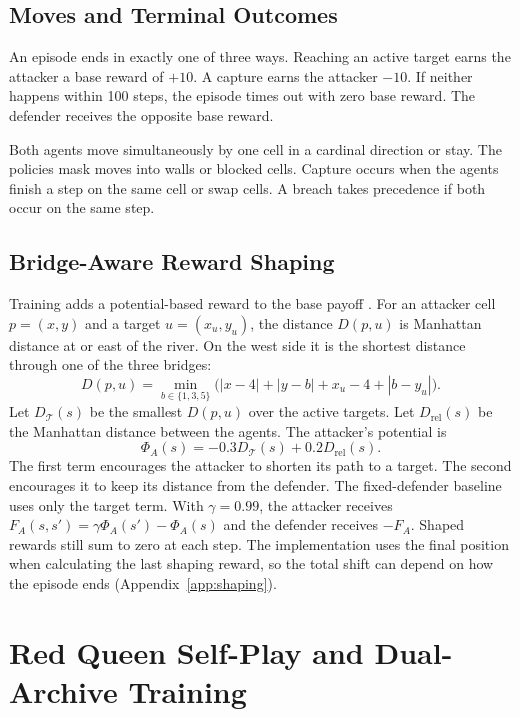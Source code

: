 \documentclass[conference,a4paper]{IEEEtran}
\begin{document}
\subsection{Moves and Terminal Outcomes}
\begin{samepage}
An episode ends in exactly one of three ways. Reaching an active target earns the attacker a base reward of $+10$. A capture earns the attacker $-10$. If neither happens within 100 steps, the episode times out with zero base reward. The defender receives the opposite base reward.

Both agents move simultaneously by one cell in a cardinal direction or stay. The policies mask moves into walls or blocked cells. Capture occurs when the agents finish a step on the same cell or swap cells. A breach takes precedence if both occur on the same step.
\end{samepage}

\subsection{Bridge-Aware Reward Shaping}
\label{sec:reward}
Training adds a potential-based reward to the base payoff \cite{ng1999policy}. For an attacker cell $p=(x,y)$ and a target $u=(x_u,y_u)$, the distance $D(p,u)$ is Manhattan distance at or east of the river. On the west side it is the shortest distance through one of the three bridges:
\begin{equation}
D(p,u)=\min_{b\in\{1,3,5\}}
\bigl( |x-4|+|y-b|+x_u-4+|b-y_u| \bigr).
\end{equation}
Let $D_{\mathcal T}(s)$ be the smallest $D(p,u)$ over the active targets. Let $D_{\mathrm{rel}}(s)$ be the Manhattan distance between the agents. The attacker's potential is
\begin{equation}
\Phi_A(s)=-0.3D_{\mathcal T}(s)+0.2D_{\mathrm{rel}}(s).
\end{equation}
The first term encourages the attacker to shorten its path to a target. The second encourages it to keep its distance from the defender. The fixed-defender baseline uses only the target term. With $\gamma=0.99$, the attacker receives $F_A(s,s')=\gamma\Phi_A(s')-\Phi_A(s)$ and the defender receives $-F_A$. Shaped rewards still sum to zero at each step. The implementation uses the final position when calculating the last shaping reward, so the total shift can depend on how the episode ends (Appendix~\ref{app:shaping}).

\section{Red Queen Self-Play and Dual-Archive Training}
\end{document}
